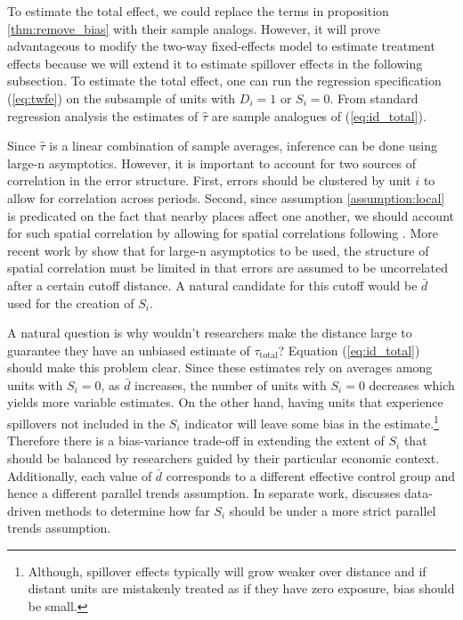 \documentclass[11pt]{article}
\begin{document}
To estimate the total effect, we could replace the terms in proposition \ref{thm:remove_bias} with their sample analogs. However, it will prove advantageous to modify the two-way fixed-effects model to estimate treatment effects because we will extend it to estimate spillover effects in the following subsection. To estimate the total effect, one can run the regression specification (\ref{eq:twfe}) on the subsample of units with $D_i = 1$ or $S_i = 0$. From standard regression analysis the estimates of $\hat{\tau}$ are sample analogues of (\ref{eq:id_total}). 

Since $\hat{\tau}$ is a linear combination of sample averages, inference can be done using large-n asymptotics. However, it is important to account for two sources of correlation in the error structure. First, errors should be clustered by unit $i$ to allow for correlation across periods. Second, since assumption \ref{assumption:local} is predicated on the fact that nearby places affect one another, we should account for such spatial correlation by allowing for spatial correlations following \citet{Conley_1999}. More recent work by \citet{Ferman_2020} show that for large-n asymptotics to be used, the structure of spatial correlation must be limited in that errors are assumed to be uncorrelated after a certain cutoff distance. A natural candidate for this cutoff would be $\bar{d}$ used for the creation of $S_i$. 

A natural question is why wouldn't researchers make the distance large to guarantee they have an unbiased estimate of $\tau_{\text{total}}$? Equation (\ref{eq:id_total}) should make this problem clear. Since these estimates rely on averages among units with $S_i = 0$, as $\bar{d}$ increases, the number of units with $S_i = 0$ decreases which yields more variable estimates. On the other hand, having units that experience spillovers not included in the $S_i$ indicator will leave some bias in the estimate.\footnote{Although, spillover effects typically will grow weaker over distance and if distant units are mistakenly treated as if they have zero exposure, bias should be small.} Therefore there is a bias-variance trade-off in extending the extent of $S_i$ that should be balanced by researchers guided by their particular economic context. Additionally, each value of $\bar{d}$ corresponds to a different effective control group and hence a different parallel trends assumption. In separate work, \citet{Butts_2021} discusses data-driven methods to determine how far $S_i$ should be under a more strict parallel trends assumption.
\end{document}
